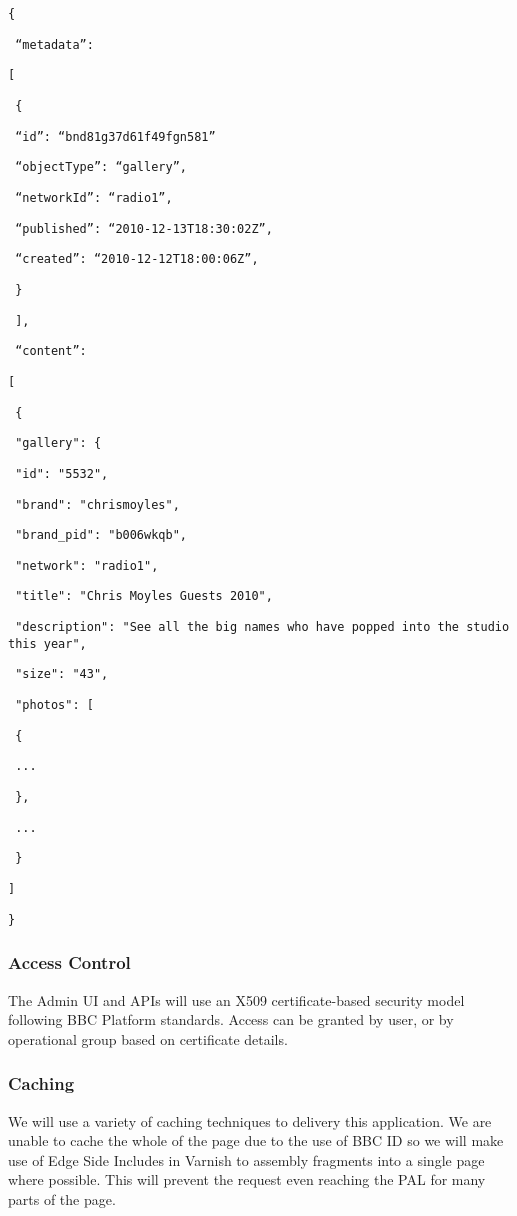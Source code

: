 \documentclass[a4paper, 11pt]{scrreprt}
\begin{document}
\texttt{\{}

\texttt{ “metadata”:}

\texttt{ {[}}

\texttt{ \{}

\texttt{ “id”: “bnd81g37d61f49fgn581”}

\texttt{ “objectType”: “gallery”,}

\texttt{ “networkId”: “radio1”,}

\texttt{ “published”: “2010-12-13T18:30:02Z”,}

\texttt{ “created”: “2010-12-12T18:00:06Z”,}

\texttt{ \}}

\texttt{ {]},}

\texttt{ “content”:}

\texttt{ {[}}

\texttt{ \{}

\texttt{ "gallery": \{}

\texttt{	 "id": "5532",}

\texttt{	 "brand": "chrismoyles",}

\texttt{	 "brand\_pid": "b006wkqb",}

\texttt{	 "network": "radio1",}

\texttt{	 "title": "Chris Moyles Guests 2010",}

\texttt{	 "description": "See all the big names who have popped into the studio this year",}

\texttt{	 "size": "43",}

\texttt{	 "photos": {[} 	 }

\texttt{ 	 \{}

\texttt{ 	 ...}

\texttt{ 	\},}

\texttt{ ...}

\texttt{ \}}

\texttt{ {]}}

\texttt{\}}


\subsubsection{Access Control}
\label{h.svdfxswioesl}
The Admin UI and APIs will use an X509 certificate-based security model following BBC Platform standards. Access can be granted by user, or by operational group based on certificate details.


\subsubsection{Caching}
\label{h.6tpowrdltylo}
We will use a variety of caching techniques to delivery this application. We are unable to cache the whole of the page due to the use of BBC ID so we will make use of Edge Side Includes in Varnish to assembly fragments into a single page where possible. This will prevent the request even reaching the PAL for many parts of the page.
\end{document}
